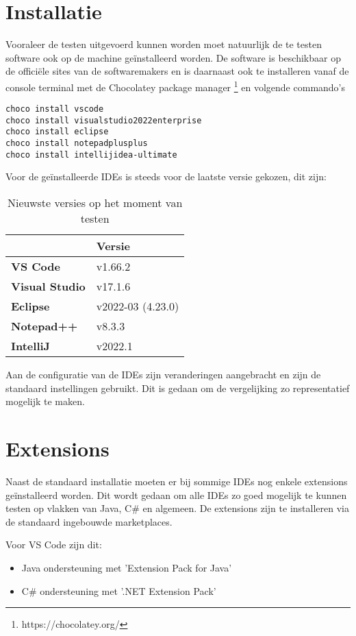 \section{Installatie}
Vooraleer de testen uitgevoerd kunnen worden moet natuurlijk de te testen software ook op de machine geïnstalleerd worden. De software is beschikbaar op de officiële sites van de softwaremakers en is daarnaast ook te installeren vanaf de console terminal met de Chocolatey package manager \footnote{https://chocolatey.org/} en volgende commando's

\begin{verbatim}
choco install vscode
choco install visualstudio2022enterprise
choco install eclipse
choco install notepadplusplus
choco install intellijidea-ultimate
\end{verbatim}

Voor de geïnstalleerde IDEs is steeds voor de laatste versie gekozen, dit zijn:
\begin{table}[h!]
	\centering
	\begin{tabular}{  l l }
		\hline
		                       & \textbf{Versie}   \\
		\hline
		\textbf{VS Code}       & v1.66.2           \\
		\textbf{Visual Studio} & v17.1.6           \\
		\textbf{Eclipse}       & v2022-03 (4.23.0) \\
		\textbf{Notepad++}     & v8.3.3            \\
		\textbf{IntelliJ}      & v2022.1           \\
		\hline
	\end{tabular}
	\caption{Nieuwste versies op het moment van testen }
	\label{tab:versie}
\end{table}

Aan de configuratie van de IDEs zijn veranderingen aangebracht en zijn de standaard instellingen gebruikt. Dit is gedaan om de vergelijking zo representatief mogelijk te maken.

\section{Extensions}
Naast de standaard installatie moeten er bij sommige IDEs nog enkele extensions geïnstalleerd worden. Dit wordt gedaan om alle IDEs zo goed mogelijk te kunnen testen op vlakken van Java, C\# en algemeen. De extensions zijn te installeren via de standaard ingebouwde marketplaces.

Voor VS Code zijn dit:
\begin{itemize}
	\item Java ondersteuning met 'Extension Pack for Java'
	\item C\# ondersteuning met '.NET Extension Pack'
\end{itemize}

